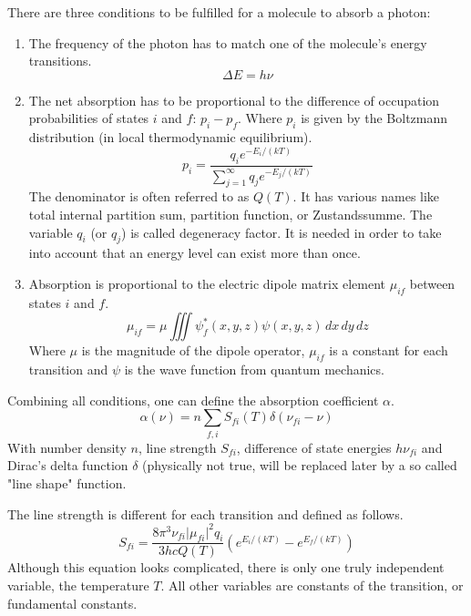 There are three conditions to be fulfilled for a molecule to absorb a
photon:
\begin{enumerate}
\item The frequency of the photon has to match one of the molecule's energy
transitions.
\begin{equation}
  \Delta E = h \nu
\end{equation}

\item The net absorption has to be proportional to the difference of occupation
probabilities of states $i$ and $f$: $p_i - p_f$. Where $p_i$ is given by the
Boltzmann distribution (in local thermodynamic equilibrium).
\begin{equation}
  p_i = \frac{q_i e^{-E_i / (kT)}}
        {\sum_{j=1}^\infty q_j e^{-E_j / (kT)}}
\end{equation}
The denominator is often referred to as $Q(T)$. It has various names like total
internal partition sum, partition function, or Zustandssumme. The variable $q_i$
(or $q_j$) is called degeneracy factor. It is needed in order to take into account
that an energy level can exist more than once.

\item Absorption is proportional to the electric dipole matrix element $\mu_{if}$
between states $i$ and $f$.
\begin{equation}
  \mu_{if} = \mu \iiint \psi_f^*(x,y,z) \psi(x,y,z) \,dx\,dy\,dz
\end{equation}
Where $\mu$ is the magnitude of the dipole operator, $\mu_{if}$ is a constant
for each transition and $\psi$ is the wave function from quantum mechanics.
\end{enumerate}

Combining all conditions, one can define the absorption coefficient $\alpha$.
\begin{equation}
  \alpha(\nu) = n \sum_{f,i} S_{fi}(T) \delta(\nu_{fi} - \nu)
\end{equation}
With number density $n$, line strength $S_{fi}$, difference of state energies
$h\nu_{fi}$ and Dirac's delta function $\delta$ (physically not true, will be
replaced later by a so called "line shape" function.

The line strength is different for each transition and defined as follows.
\begin{equation}
    S_{fi} = \frac{8\pi^3\nu_{fi} \lvert\mu_{fi}\rvert^2 q_i}{3hcQ(T)}
      \left( e^{E_i/(kT)} - e^{E_f/(kT)} \right)
\end{equation}
Although this equation looks complicated, there is only one truly independent
variable, the temperature $T$. All other variables are constants of the
transition, or fundamental constants.

